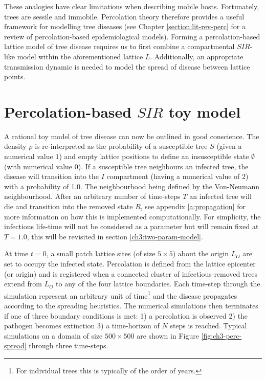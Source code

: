 These analogies have clear limitations when describing mobile hosts. %
Fortunately, trees are sessile and immobile. %
Percolation theory therefore provides a useful framework for modelling tree diseases (see Chapter \ref{section:lit-rev-perc} for a review of percolation-based epidemiological models). %
Forming a percolation-based lattice model of tree disease requires us to first combine a compartmental $SIR$-like model within the aforementioned lattice $L$. %
Additionally, an appropriate transmission dynamic is needed to model the spread of disease between lattice points. %


\section{Percolation-based $SIR$ toy model}

A rational toy model of tree disease can now be outlined in good conscience. %
The density $\rho$ is re-interpreted as the probability of a susceptible tree $S$ (given a numerical value $1$) and empty lattice positions to define an insusceptible state $\emptyset$ (with numerical value $0$). %
If a susceptible tree neighbours an infected tree, the disease  will transition into the $I$ compartment (having a numerical value of $2$) with a probability of 1.0. %
The neighbourhood being defined by the Von-Neumann neighbourhood. %
After an arbitrary number of time-steps $T$ an infected tree will die and transition into the removed state $R$, see appendix \ref{a:propagation} for more information on how this is implemented computationally. %
For simplicity, the infectious life-time will not be considered as a parameter but will remain fixed at $T=1.0$, %
this will be revisited in section \ref{ch3:two-param-model}.

At time $t=0$, a small patch lattice sites (of size $5\times5$) about the origin $L_O$ are set to occupy the infected state. %
Percolation is defined from the lattice epicenter (or origin) and is registered when a connected cluster of infectious-removed trees extend from $L_O$ to any of the four lattice boundaries. %
Each time-step through the simulation represent an arbitrary unit of time\footnote{For individual trees this is typically of the order of years.} %
and the disease propagates according to the spreading heuristics. %
The numerical simulations then terminates if one of three boundary conditions is met: %
1) a percolation is observed %
2) the pathogen becomes extinction %
3) a time-horizon of $N$ steps is reached. %
Typical simulations on a domain of size $500 \times 500$ are shown in Figure \ref{fig:ch3-perc-spread} through three time-steps. %

